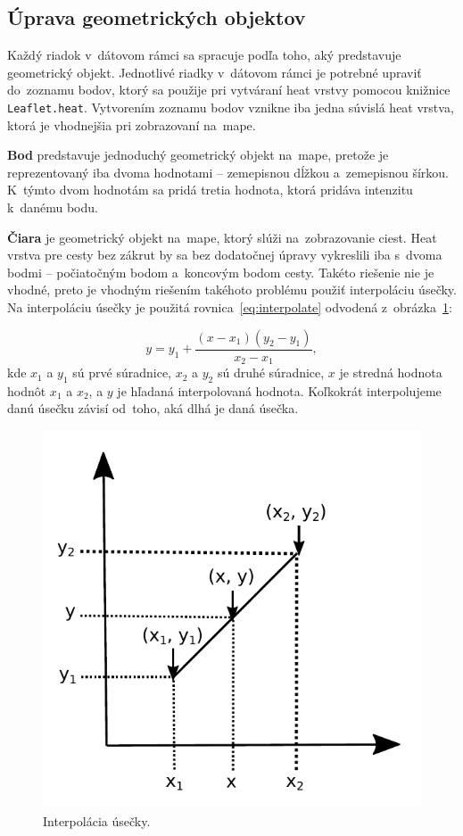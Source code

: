 \subsection*{Úprava geometrických objektov}
Každý riadok v~dátovom rámci sa spracuje podľa toho, aký predstavuje geometrický objekt. Jednotlivé riadky v~dátovom rámci je potrebné upraviť do~zoznamu bodov, ktorý sa použije pri vytváraní heat vrstvy pomocou knižnice \texttt{Leaflet.heat}. Vytvorením zoznamu bodov vznikne iba jedna súvislá heat vrstva, ktorá je vhodnejšia pri zobrazovaní na~mape.

\textbf{Bod} predstavuje jednoduchý geometrický objekt na~mape, pretože je reprezentovaný iba dvoma hodnotami \--- zemepisnou dĺžkou a~zemepisnou šírkou. K~týmto dvom hodnotám sa pridá tretia hodnota, ktorá pridáva intenzitu k~danému bodu.

\textbf{Čiara} je geometrický objekt na~mape, ktorý slúži na~zobrazovanie ciest. Heat vrstva pre cesty bez zákrut by sa bez dodatočnej úpravy vykreslili iba s~dvoma bodmi \--- počiatočným bodom a~koncovým bodom cesty. Takéto riešenie nie je vhodné, preto je vhodným riešením takéhoto problému použiť interpoláciu úsečky. Na interpoláciu úsečky je použitá rovnica~\ref{eq:interpolate} odvodená z~obrázka~\ref{fig:interpolate}:

\begin{equation}
    y = y_1 + \frac{(x - x_1)(y_2 - y_1)}{x_2 - x_1},
    \label{eq:interpolate}
\end{equation}
kde $x_1$ a $y_1$ sú prvé súradnice, $x_2$ a $y_2$ sú druhé súradnice, $x$ je stredná hodnota hodnôt $x_1$ a $x_2$, a $y$ je hľadaná interpolovaná hodnota. Koľkokrát interpolujeme danú úsečku závisí od~toho, aká dlhá je daná úsečka.

\begin{figure}[ht]
    \centering
    \includegraphics[width=0.4\linewidth]{obrazky-figures/linear-interpolation.pdf}
    \caption{Interpolácia úsečky.}
    \label{fig:interpolate}
\end{figure}

